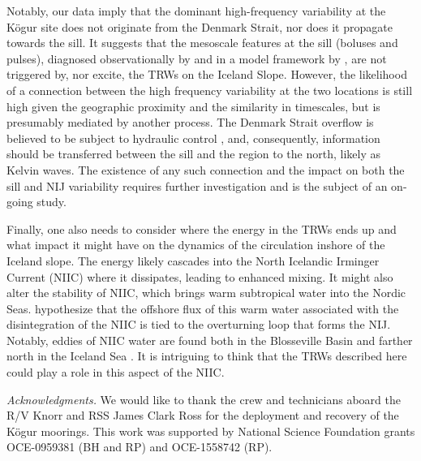 \documentclass[12pt,titlepage,figuresatend]{article}
\begin{document}
Notably, our data imply that the dominant high-frequency variability at the K\"{o}gur site does not originate from the Denmark Strait, nor does it propagate towards the sill. It suggests that the mesoscale features at the sill (boluses and pulses), diagnosed observationally by \cite{Appen2017} and in a model framework by \cite{Almansi2017}, are not triggered by, nor excite, the TRWs on the Iceland Slope. However, the likelihood of a connection between the high frequency variability at the two locations is still high given the geographic proximity and the similarity in timescales, but is presumably mediated by another process. The Denmark Strait overflow is believed to be subject to hydraulic control \cite[]{Whitehead1998,Nikolopoulos2003}, and, consequently, information should be transferred between the sill and the region to the north, likely as Kelvin waves. The existence of any such connection and the impact on both the sill and NIJ variability requires further investigation and is the subject of an on-going study. 

Finally, one also needs to consider where the energy in the TRWs ends up and what impact it might have on the dynamics of the circulation inshore of the Iceland slope. The energy likely cascades into the North Icelandic Irminger Current (NIIC) where it dissipates, leading to enhanced mixing. It might also alter the stability of NIIC, which brings warm subtropical water into the Nordic Seas. \citet[]{Vage2011} hypothesize that the offshore flux of this warm water associated with the disintegration of the NIIC is tied to the overturning loop that forms the NIJ. Notably, eddies of NIIC water are found both in the Blosseville Basin \cite[]{Jonsson2012} and farther north in the Iceland Sea \cite[]{Vage2011}. It is intriguing to think that the TRWs described here could play a role in this aspect of the NIIC. 


\bigskip
\emph{Acknowledgments.}
We would like to thank the crew and technicians aboard the R/V Knorr and RSS James Clark Ross for the deployment and recovery of the K\"{o}gur moorings. This work was supported by National Science Foundation grants OCE-0959381 (BH and RP) and OCE-1558742 (RP). 




\end{document}
